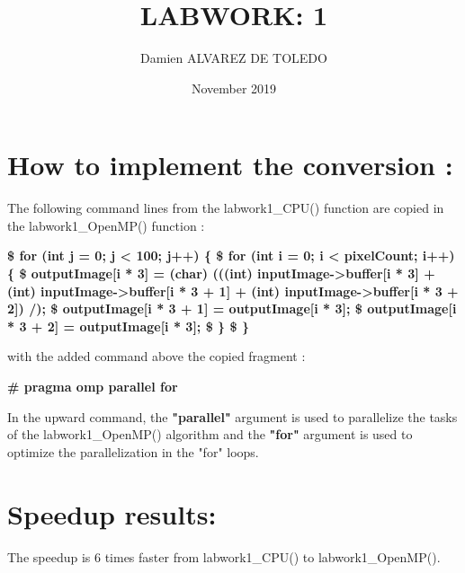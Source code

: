 \documentclass{article}
\title{LABWORK: 1}
\author{Damien ALVAREZ DE TOLEDO }
\date{November 2019}
\begin{document}
\maketitle

\section{How to implement the conversion :}\newline

The following command lines from the labwork1\_CPU() function \newline 
are copied in the labwork1\_OpenMP() function : 
\newline

\textbf{  \$ for (int j = 0; j < 100; j++) \{  \newline  
  \$     for (int i = 0; i < pixelCount; i++) \{\newline
  \$         outputImage[i * 3] = (char) (((int) inputImage->buffer[i * 3] + (int) \newline	inputImage->buffer[i * 3 + 1] + (int) inputImage->buffer[i * 3 + 2]) /);\newline
          \$  outputImage[i * 3 + 1] = outputImage[i * 3];\newline
          \$ outputImage[i * 3 + 2] = outputImage[i * 3];\newline
      \$ \}\newline
  \$  \}\newline}
  \newline 
  
  with the added command above the copied fragment : \newline
  
  \textbf{\# pragma omp parallel for} \newline
  
  In the upward command, the \textbf{"parallel"} argument is used to parallelize the tasks of the labwork1\_OpenMP() algorithm and the \textbf{"for"} argument is used to optimize the parallelization in the "for" loops. \newline 

\section{Speedup results:}\newline

The speedup is 6 times faster from labwork1\_CPU() to labwork1\_OpenMP(). 
\end{document}
